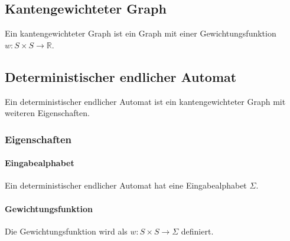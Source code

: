 \documentclass[../main.tex]{subfiles}
\begin{document}
        \subsection{Kantengewichteter Graph}
            Ein kantengewichteter Graph ist ein Graph mit einer Gewichtungsfunktion $w\colon S \times S \rightarrow \mathbb{R}$.
            
            \begin{center}
            \end{center}
            
        \subsection[DEA]{Deterministischer endlicher Automat}
            \label{section:DiskreteMathematik:FormaleGrundlagen:DEA}
            Ein deterministischer endlicher Automat ist ein kantengewichteter Graph mit weiteren Eigenschaften.
            
            \subsubsection{Eigenschaften}
                \paragraph{Eingabealphabet}
                    Ein deterministischer endlicher Automat hat eine Eingabealphabet $\Sigma$.
                
                \paragraph{Gewichtungsfunktion}
                    Die Gewichtungsfunktion wird als $w\colon S \times S \rightarrow \Sigma$ definiert.
                    
\end{document}
